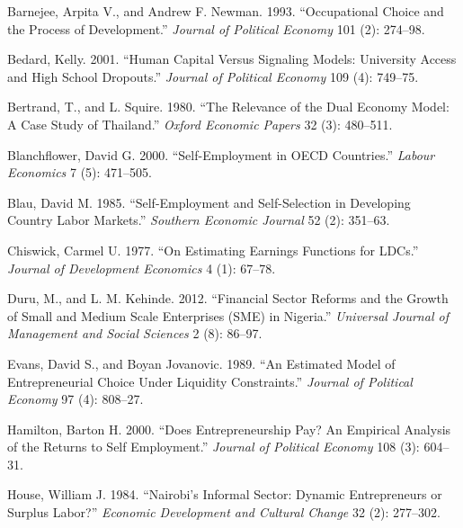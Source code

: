 \documentclass[
  a4paper,
  DIV=11,
  numbers=noendperiod]{scrartcl}
\newlength{\cslhangindent}
\newlength{\cslentryspacingunit} %
\newenvironment{CSLReferences}[2] %
 {%
  \setlength{\parindent}{0pt}
  \ifodd #1
  \let\oldpar\par
  \def\par{\hangindent=\cslhangindent\oldpar}
  \fi
  \setlength{\parskip}{#2\cslentryspacingunit}
 }%
 {}
\begin{document}
\hypertarget{refs}{}
\begin{CSLReferences}{1}{0}
\leavevmode{}%
Barnejee, Arpita V., and Andrew F. Newman. 1993. {``Occupational Choice
and the Process of Development.''} \emph{Journal of Political Economy}
101 (2): 274--98.

\leavevmode{}%
Bedard, Kelly. 2001. {``Human Capital Versus Signaling Models:
University Access and High School Dropouts.''} \emph{Journal of
Political Economy} 109 (4): 749--75.

\leavevmode{}%
Bertrand, T., and L. Squire. 1980. {``The Relevance of the Dual Economy
Model: A Case Study of Thailand.''} \emph{Oxford Economic Papers} 32
(3): 480--511.

\leavevmode{}%
Blanchflower, David G. 2000. {``Self-Employment in OECD Countries.''}
\emph{Labour Economics} 7 (5): 471--505.

\leavevmode{}%
Blau, David M. 1985. {``Self-Employment and Self-Selection in Developing
Country Labor Markets.''} \emph{Southern Economic Journal} 52 (2):
351--63.

\leavevmode{}%
Chiswick, Carmel U. 1977. {``On Estimating Earnings Functions for
LDCs.''} \emph{Journal of Development Economics} 4 (1): 67--78.

\leavevmode{}%
Duru, M., and L. M. Kehinde. 2012. {``Financial Sector Reforms and the
Growth of Small and Medium Scale Enterprises (SME) in Nigeria.''}
\emph{Universal Journal of Management and Social Sciences} 2 (8):
86--97.

\leavevmode{}%
Evans, David S., and Boyan Jovanovic. 1989. {``An Estimated Model of
Entrepreneurial Choice Under Liquidity Constraints.''} \emph{Journal of
Political Economy} 97 (4): 808--27.

\leavevmode{}%
Hamilton, Barton H. 2000. {``Does Entrepreneurship Pay? An Empirical
Analysis of the Returns to Self Employment.''} \emph{Journal of
Political Economy} 108 (3): 604--31.

\leavevmode{}%
House, William J. 1984. {``Nairobi's Informal Sector: Dynamic
Entrepreneurs or Surplus Labor?''} \emph{Economic Development and
Cultural Change} 32 (2): 277--302.


\end{CSLReferences}
\end{document}
